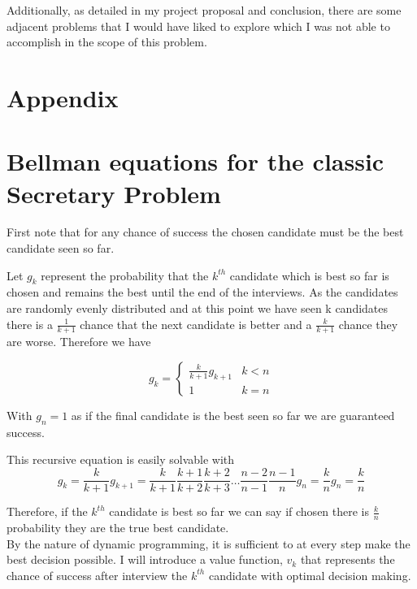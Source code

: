 \documentclass[a4paper,11pt]{article}
\begin{document}
Additionally, as detailed in my project proposal and conclusion, there are some adjacent problems that I would have liked to explore which I was not able to accomplish in the scope of this problem.



 


\section*{Appendix}


\appendix

\section{Bellman equations for the classic Secretary Problem}
\label{sec:AppendixA}

First note that for any chance of success the chosen candidate must be the best candidate seen so far.

Let $g_k$ represent the probability that the $k^{th}$ candidate which is best so far is chosen and remains the best until the end of the interviews. As the candidates are randomly evenly distributed and at this point we have seen k candidates there is a $\frac{1}{k+1}$ chance that the next candidate is better and a $\frac{k}{k+1}$ chance they are worse. Therefore we have

$$
g_k = 
\begin{cases}
   \frac{k}{k+1}g_{k+1} &  k < n \\
   1& k = n
\end{cases}
$$

With $g_n = 1$ as if the final candidate is the best seen so far we are guaranteed success.

This recursive equation is easily solvable with
$$
g_k = \frac{k}{k+1}g_{k+1} = \frac{k}{k+1}\frac{k+1}{k+2}\frac{k+2}{k+3} \dots \frac{n-2}{n-1} \frac{n-1}{n}g_n = \frac{k}{n} g_n = \frac{k}{n}
$$

Therefore, if the $k^{th}$ candidate is best so far we can say if chosen there is $\frac{k}{n}$ probability they are the true best candidate.\\

By the nature of dynamic programming, it is sufficient to at every step make the best decision possible. I will introduce a value function, $v_k$ that represents the chance of success after interview the $k^{th}$ candidate with optimal decision making.
\end{document}
